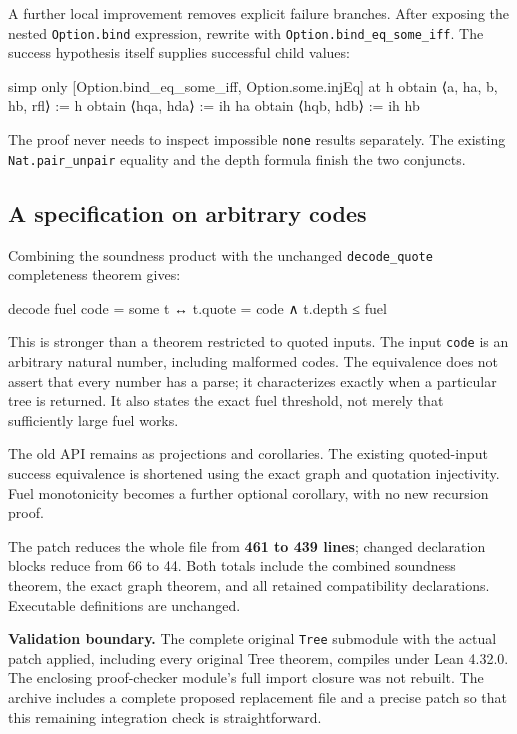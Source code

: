 \documentclass[11pt,letterpaper]{article}
\newcommand{\code}[1]{\nolinkurl{#1}}
\begin{document}
A further local improvement removes explicit failure branches. After exposing the nested \code{Option.bind} expression, rewrite with \code{Option.bind_eq_some_iff}. The success hypothesis itself supplies successful child values:

\begin{Lean}
simp only [Option.bind_eq_some_iff, Option.some.injEq] at h
obtain ⟨a, ha, b, hb, rfl⟩ := h
obtain ⟨hqa, hda⟩ := ih ha
obtain ⟨hqb, hdb⟩ := ih hb
\end{Lean}

The proof never needs to inspect impossible \code{none} results separately. The existing \code{Nat.pair_unpair} equality and the depth formula finish the two conjuncts.

\subsection{A specification on arbitrary codes}

Combining the soundness product with the unchanged \code{decode_quote} completeness theorem gives:

\begin{Lean}
decode fuel code = some t ↔ t.quote = code ∧ t.depth ≤ fuel
\end{Lean}

This is stronger than a theorem restricted to quoted inputs. The input \code{code} is an arbitrary natural number, including malformed codes. The equivalence does not assert that every number has a parse; it characterizes exactly when a particular tree is returned. It also states the exact fuel threshold, not merely that sufficiently large fuel works.

The old API remains as projections and corollaries. The existing quoted-input success equivalence is shortened using the exact graph and quotation injectivity. Fuel monotonicity becomes a further optional corollary, with no new recursion proof.

The patch reduces the whole file from \textbf{461 to 439 lines}; changed declaration blocks reduce from 66 to 44. Both totals include the combined soundness theorem, the exact graph theorem, and all retained compatibility declarations. Executable definitions are unchanged.

\textbf{Validation boundary.} The complete original \code{Tree} submodule with the actual patch applied, including every original Tree theorem, compiles under Lean 4.32.0. The enclosing proof-checker module's full import closure was not rebuilt. The archive includes a complete proposed replacement file and a precise patch so that this remaining integration check is straightforward.
\end{document}
